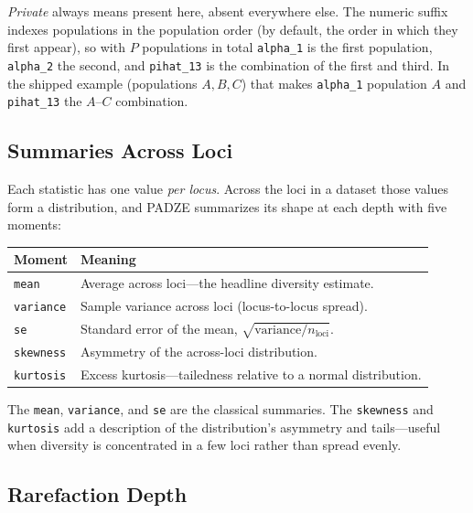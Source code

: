 \documentclass[11pt]{article}
\newcommand{\padze}{PADZE}
\begin{document}
\emph{Private} always means present here, absent everywhere else. The numeric
suffix indexes populations in the population order (by default, the order in
which they first appear), so with \(P\) populations in total \texttt{alpha\_1}
is the first population, \texttt{alpha\_2} the second, and \texttt{pihat\_13} is
the combination of the first and third. In the shipped example (populations
\(A, B, C\)) that makes \texttt{alpha\_1} population \(A\) and \texttt{pihat\_13}
the \(A\)--\(C\) combination.

\subsection{Summaries Across Loci}

Each statistic has one value \emph{per locus}. Across the loci in a dataset those
values form a distribution, and \padze{} summarizes its shape at each depth with
five moments:

\begin{center}
\begin{tabular}{@{}>{\raggedright\arraybackslash}p{}>{\raggedright\arraybackslash}p{}@{}}
\toprule
\textbf{Moment} & \textbf{Meaning} \\
\midrule
\texttt{mean} & Average across loci---the headline diversity estimate. \\
\texttt{variance} & Sample variance across loci (locus-to-locus spread). \\
\texttt{se} & Standard error of the mean, \(\sqrt{\text{variance}/n_{\text{loci}}}\). \\
\texttt{skewness} & Asymmetry of the across-loci distribution. \\
\texttt{kurtosis} & Excess kurtosis---tailedness relative to a normal distribution. \\
\bottomrule
\end{tabular}
\end{center}

The \texttt{mean}, \texttt{variance}, and \texttt{se} are the classical
summaries. The \texttt{skewness} and \texttt{kurtosis} add a description of the
distribution's asymmetry and tails---useful when diversity is concentrated in a
few loci rather than spread evenly.

\subsection{Rarefaction Depth}
\label{sec:depth}
\end{document}
